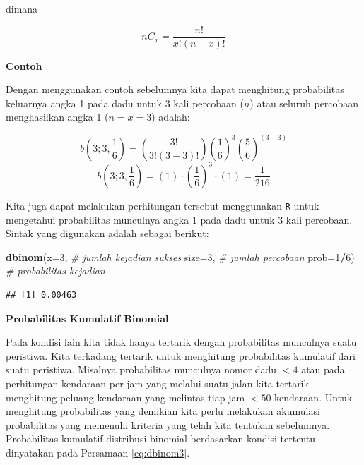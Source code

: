 \documentclass[]{book}
\newenvironment{Shaded}{\begin{snugshade}}{\end{snugshade}}
\newcommand{\KeywordTok}[1]{\textcolor[rgb]{0.13,0.29,0.53}{\textbf{#1}}}
\newcommand{\DataTypeTok}[1]{\textcolor[rgb]{0.13,0.29,0.53}{#1}}
\newcommand{\DecValTok}[1]{\textcolor[rgb]{0.00,0.00,0.81}{#1}}
\newcommand{\CommentTok}[1]{\textcolor[rgb]{0.56,0.35,0.01}{\textit{#1}}}
\newcommand{\OperatorTok}[1]{\textcolor[rgb]{0.81,0.36,0.00}{\textbf{#1}}}
\newcommand{\NormalTok}[1]{#1}
\begin{document}
dimana

\begin{equation}
   nC_x=\frac{n!}{x!\left(n-x\right)!}
  \label{eq:dbinom2}
\end{equation}

\textbf{Contoh}

Dengan menggunakan contoh sebelumnya kita dapat menghitung probabilitas
keluarnya angka 1 pada dadu untuk 3 kali percobaan (\(n\)) atau seluruh
percobaan menghasilkan angka 1 (\(n=x=3\)) adalah:

\[
b\left(3;3,\frac{1}{6}\right)=\left(\frac{3!}{3!\left(3-3\right)!}\right)\left(\frac{1}{6}\right)^3\left(\frac{5}{6}\right)^{\left(3-3\right)}
\] \[
b\left(3;3,\frac{1}{6}\right)=\left(1\right)\cdot\left(\frac{1}{6}\right)^3\cdot\left(1\right)=\frac{1}{216}
\]

Kita juga dapat melakukan perhitungan tersebut menggunakan \texttt{R}
untuk mengetahui probabilitas munculnya angka 1 pada dadu untuk 3 kali
percobaan. Sintak yang digunakan adalah sebagai berikut:

\begin{Shaded}
\begin{Highlighting}[]
\KeywordTok{dbinom}\NormalTok{(}\DataTypeTok{x=}\DecValTok{3}\NormalTok{, }\CommentTok{# jumlah kejadian sukses }
       \DataTypeTok{size=}\DecValTok{3}\NormalTok{, }\CommentTok{# jumlah percobaan}
       \DataTypeTok{prob=}\DecValTok{1}\OperatorTok{/}\DecValTok{6}\NormalTok{) }\CommentTok{# probabilitas kejadian}
\end{Highlighting}
\end{Shaded}

\begin{verbatim}
## [1] 0.00463
\end{verbatim}

\textbf{Probabilitas Kumulatif Binomial}

Pada kondisi lain kita tidak hanya tertarik dengan probabilitas
munculnya suatu peristiwa. Kita terkadang tertarik untuk menghitung
probabilitas kumulatif dari suatu peristiwa. Misalnya probabilitas
munculnya nomor dadu \(<4\) atau pada perhitungan kendaraan per jam yang
melalui suatu jalan kita tertarik menghitung peluang kendaraan yang
melintas tiap jam \(<50\) kendaraan. Untuk menghitung probabilitas yang
demikian kita perlu melakukan akumulasi probabilitas yang memenuhi
kriteria yang telah kita tentukan sebelumnya. Probabilitas kumulatif
distribusi binomial berdasarkan kondisi tertentu dinyatakan pada
Persamaan \eqref{eq:dbinom3}.
\end{document}
